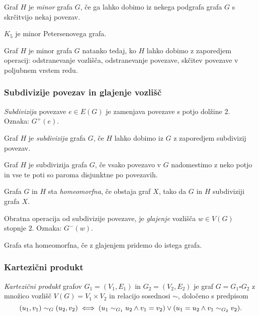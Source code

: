 \begin{definicija}
    Graf $H$ je \emph{minor} grafa $G$, če ga lahko dobimo iz nekega podgrafa grafa $G$ s skrčitvijo nekaj povezav.
\end{definicija}

\begin{primer}
    $K_5$ je minor Petersenovega grafa.
\end{primer}

\begin{opomba}
    Graf $H$ je minor grafa $G$ natanko tedaj, ko $H$ lahko dobimo z zaporedjem operacij: odstranevanje vozlišča, odstranevanje povezave, skčitev povezave v poljubnem vrstem redu.
\end{opomba}

\newpage
\subsubsection*{Subdivizije povezav in glajenje vozlišč}
\begin{definicija}
    \emph{Subdivizija} povezave $e \in E(G)$ je zamenjava povezave s potjo dolžine $2$. Oznaka: $G^+(e)$.
\end{definicija}
\begin{definicija}
    Graf $H$ je \emph{subdivizija} grafa $G$, če $H$ lahko dobimo iz $G$ z zaporedjem subdivizij povezav.
\end{definicija}
\begin{opomba}
    Graf $H$ je subdivizija grafa $G$, če vsako povezavo v $G$ nadomestimo z neko potjo in vse te poti so paroma disjunktne po povezavih.
\end{opomba}
\begin{definicija}
    Grafa $G$ in $H$ sta \emph{homeomorfna}, če obstaja graf $X$, tako da $G$ in $H$ subdiviziji grafa $X$.
\end{definicija}

\begin{definicija}
    Obratna operacija od subdivizije povezave, je \emph{glajenje} vozlišča $w \in V(G)$ stopnje $2$. Oznaka: $G^-(w)$.
\end{definicija}

\begin{opomba}
    Grafa sta homeomorfna, če z glajenjem pridemo do istega grafa.
\end{opomba}

\subsubsection*{Kartezični produkt}
\begin{definicija}
    \emph{Kartezični produkt} grafov $G_1 = (V_1, E_1)$ in $G_2 = (V_2, E_2)$ je graf $G = G_1 \square G_2$ z množico vozlišč $V(G) = V_1 \times V_2$ in relacijo sosednosi $\sim$, določeno s predpisom
    $$(u_1, v_1) \sim_G (u_2, v_2) \iff (u_1 \sim_{G_1} u_2 \land v_1 = v_2) \lor (u_1 = u_2 \land v_1 \sim_{G_2} v_2).$$
\end{definicija}

